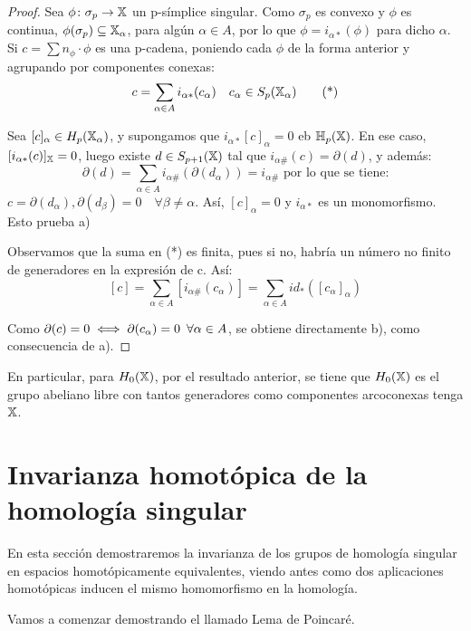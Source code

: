 \begin{proof}
  Sea $\phi \colon \sigma_p \to {\mathbb X}$ un p-símplice singular. Como $\sigma_p$ es convexo y $\phi$ es continua, $\phi(\sigma_p) \subseteq {\mathbb X}_\alpha$, para algún
  $\alpha \in A$, por lo que $\phi = i_{\alpha*}(\phi)$ para dicho $\alpha$. \\
  Si $c = \sum n_\phi \cdot \phi$ es una p-cadena, poniendo cada $\phi$ de la forma anterior y agrupando por componentes conexas:
  \begin{equation}
    c = \sum\limits_{\alpha \in A} i_{\alpha*}(c_\alpha) \quad c_\alpha \in S_p({\mathbb X}_\alpha)  \tag{*}
  \end{equation}

  Sea $[c]_\alpha \in H_p({\mathbb X}_\alpha)$, y supongamos que $i_{\alpha*}[c]_\alpha = 0$ eb ${\mathbb H}_p({\mathbb X})$. En ese caso, $[i_{\alpha*}(c)]_{\mathbb X} = 0$,
  luego existe $d \in S_{p+1}({\mathbb X})$ tal que $i_{\alpha\#}(c) = \partial(d)$, y además: \\
  \[\partial(d) = \sum\limits_{\alpha \in A} i_{\alpha\#}(\partial(d_\alpha)) = i_{\alpha\#} \text{ por lo que se tiene:} \]
  $c = \partial(d_\alpha), \partial(d_\beta) = 0 \quad \forall \beta \neq \alpha$. Así, $[c]_\alpha = 0$ y $i_{\alpha*}$ es un monomorfismo.
  Esto prueba a)

  Observamos que la suma en (*) es finita, pues si no, habría un número no finito de generadores en la expresión de c. Así:
  \[  [c] = \sum\limits_{\alpha \in A} [i_{\alpha\#}(c_\alpha)] =  \sum\limits_{\alpha \in A} id_*([c_\alpha]_\alpha)\]

  Como $\partial(c) = 0 \iff \partial(c_\alpha) = 0 \hspace{0.5em} \forall \alpha \in A$, se obtiene directamente b), como consecuencia de a).
\end{proof}

En particular, para $H_0({\mathbb X})$, por el resultado anterior, se tiene que $H_0({\mathbb X})$ es el grupo abeliano libre con tantos generadores como
componentes arcoconexas tenga ${\mathbb X}$.

\section{Invarianza homotópica de la homología singular}

En esta sección demostraremos la invarianza de los grupos de homología singular en espacios homotópicamente equivalentes, viendo antes como
dos aplicaciones homotópicas inducen el mismo homomorfismo en la homología.

Vamos a comenzar demostrando el llamado Lema de Poincaré.

